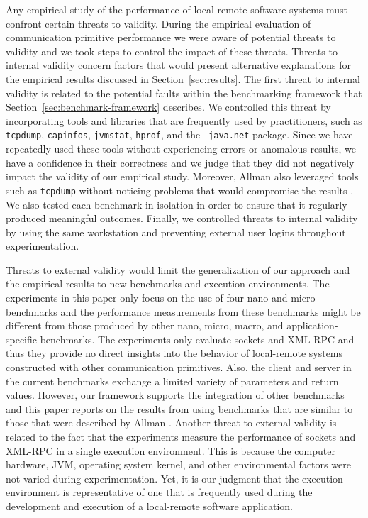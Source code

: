 \documentclass{sig-alternate}
\begin{document}
Any empirical study of the performance of local-remote software
systems must confront certain threats to validity.  During the
empirical evaluation of communication primitive performance we were
aware of potential threats to validity and we took steps to control
the impact of these threats.  Threats to internal validity concern
factors that would present alternative explanations for the empirical
results discussed in Section~\ref{sec:results}.  The first threat to
internal validity is related to the potential faults within the
benchmarking framework that Section~\ref{sec:benchmark-framework}
describes.  We controlled this threat by incorporating tools and
libraries that are frequently used by practitioners, such as {\tt
  tcpdump}, {\tt capinfos}, {\tt jvmstat}, {\tt hprof}, and the {\tt
  java.net} package.  Since we have repeatedly used these tools
without experiencing errors or anomalous results, we have a confidence
in their correctness and we judge that they did not negatively impact
the validity of our empirical study.  Moreover, Allman also leveraged
tools such as {\tt tcpdump} without noticing problems that would
compromise the results \cite{allman-per}.  We also tested each
benchmark in isolation in order to ensure that it regularly produced
meaningful outcomes.  Finally, we controlled threats to internal
validity by using the same workstation and preventing external user
logins throughout experimentation.

Threats to external validity would limit the generalization of our
approach and the empirical results to new benchmarks and execution
environments.  The experiments in this paper only focus on the use of
four nano and micro benchmarks and the performance measurements from
these benchmarks might be different from those produced by other nano,
micro, macro, and application-specific benchmarks.  The experiments
only evaluate sockets and XML-RPC and thus they provide no direct
insights into the behavior of local-remote systems constructed with
other communication primitives.  Also, the client and server in the
current benchmarks exchange a limited variety of parameters and return
values.  However, our framework supports the integration of other
benchmarks and this paper reports on the results from using benchmarks
that are similar to those that were described by Allman
\cite{allman-per}.  Another threat to external validity is related to
the fact that the experiments measure the performance of sockets and
XML-RPC in a single execution environment. This is because the
computer hardware, JVM, operating system kernel, and other
environmental factors were not varied during experimentation.  Yet, it
is our judgment that the execution environment is representative of
one that is frequently used during the development and execution of a
local-remote software application.
\end{document}
